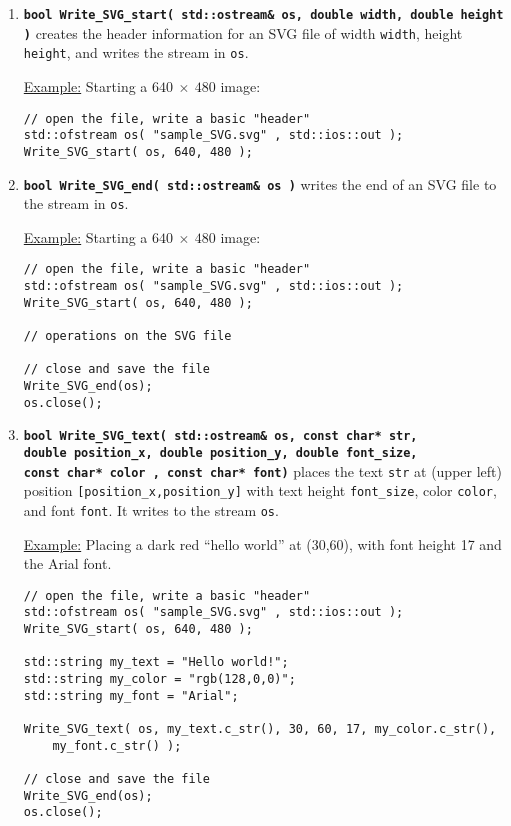 \documentclass[12pt]{article}
\renewcommand{\v}{\verb}
\newcommand{\smallcode}[1]{\textbf{\texttt{#1}}}
\begin{document}
\begin{enumerate}
\item 
\smallcode{bool Write\_SVG\_start( std::ostream\& os, double width, double height )} 
creates the header information for an SVG file of width \v|width|, 
height \v|height|, and writes the stream in \v|os|. 

\underline{Example:} Starting a $640 \: \times \: 480$ image: %
\begin{verbatim}
// open the file, write a basic "header"
std::ofstream os( "sample_SVG.svg" , std::ios::out );
Write_SVG_start( os, 640, 480 ); 
\end{verbatim}

\item 
\smallcode{bool Write\_SVG\_end( std::ostream\& os )} 
writes the end of an SVG file to the stream in \v|os|. 

\underline{Example:} Starting a $640 \: \times \: 480$ image:%
\begin{verbatim}
// open the file, write a basic "header"
std::ofstream os( "sample_SVG.svg" , std::ios::out );
Write_SVG_start( os, 640, 480 ); 

// operations on the SVG file

// close and save the file 
Write_SVG_end(os); 
os.close(); 
\end{verbatim}

\item 
\smallcode{bool Write\_SVG\_text( std::ostream\& os, const char* str,\\
\phantom{bool }double position\_x, double position\_y, double font\_size, \\
\phantom{bool }const char* color , const char* font)} places the text 
\v|str| at (upper left) position 
\v|[position_x,position_y]| with text height \v|font_size|, color \v|color|, 
and font \v|font|. It writes to the stream \v|os|. 

\underline{Example:} Placing a dark red ``hello world'' at (30,60), with 
font height 17 and the Arial font. %
\begin{verbatim}
// open the file, write a basic "header"
std::ofstream os( "sample_SVG.svg" , std::ios::out );
Write_SVG_start( os, 640, 480 ); 

std::string my_text = "Hello world!"; 
std::string my_color = "rgb(128,0,0)"; 
std::string my_font = "Arial"; 

Write_SVG_text( os, my_text.c_str(), 30, 60, 17, my_color.c_str(), 
    my_font.c_str() ); 

// close and save the file 
Write_SVG_end(os); 
os.close(); 
\end{verbatim}


\end{enumerate}
\end{document}
